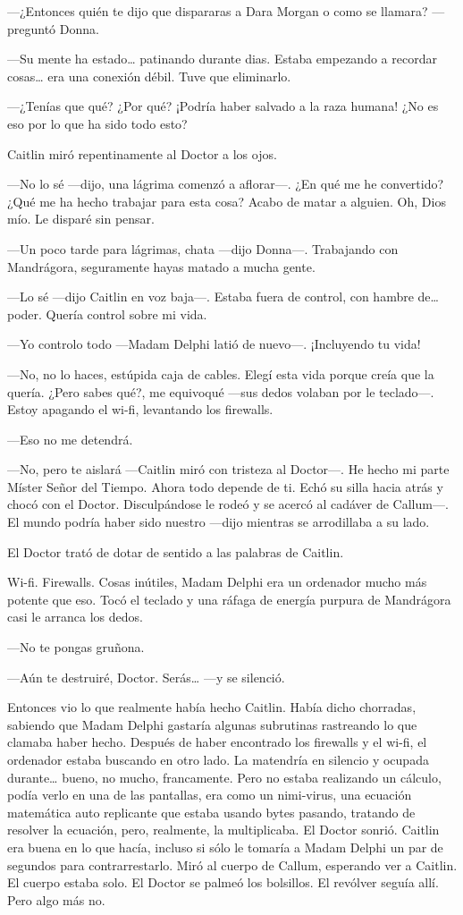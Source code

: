 ---¿Entonces quién te dijo que dispararas a Dara Morgan o como se
llamara? ---preguntó Donna.

---Su mente ha estado\ldots{} patinando durante dias. Estaba empezando a
recordar cosas\ldots{} era una conexión débil. Tuve que eliminarlo.

---¿Tenías que qué? ¿Por qué? ¡Podría haber salvado a la raza humana!
¿No es eso por lo que ha sido todo esto?

Caitlin miró repentinamente al Doctor a los ojos.

---No lo sé ---dijo, una lágrima comenzó a aflorar---. ¿En qué me he
convertido? ¿Qué me ha hecho trabajar para esta cosa? Acabo de matar a
alguien. Oh, Dios mío. Le disparé sin pensar.

---Un poco tarde para lágrimas, chata ---dijo Donna---. Trabajando con
Mandrágora, seguramente hayas matado a mucha gente.

---Lo sé ---dijo Caitlin en voz baja---. Estaba fuera de control, con
hambre de\ldots{} poder. Quería control sobre mi vida.

---Yo controlo todo ---Madam Delphi latió de nuevo---. ¡Incluyendo tu
vida!

---No, no lo haces, estúpida caja de cables. Elegí esta vida porque
creía que la quería. ¿Pero sabes qué?, me equivoqué ---sus dedos volaban
por le teclado---. Estoy apagando el wi-fi, levantando los firewalls.

---Eso no me detendrá.

---No, pero te aislará ---Caitlin miró con tristeza al Doctor---. He
hecho mi parte Míster Señor del Tiempo. Ahora todo depende de ti. Echó
su silla hacia atrás y chocó con el Doctor. Disculpándose le rodeó y se
acercó al cadáver de Callum---. El mundo podría haber sido nuestro
---dijo mientras se arrodillaba a su lado.

El Doctor trató de dotar de sentido a las palabras de Caitlin.

Wi-fi. Firewalls. Cosas inútiles, Madam Delphi era un ordenador mucho
más potente que eso. Tocó el teclado y una ráfaga de energía purpura de
Mandrágora casi le arranca los dedos.

---No te pongas gruñona.

---Aún te destruiré, Doctor. Serás\ldots{} ---y se silenció.

Entonces vio lo que realmente había hecho Caitlin. Había dicho
chorradas, sabiendo que Madam Delphi gastaría algunas subrutinas
rastreando lo que clamaba haber hecho. Después de haber encontrado los
firewalls y el wi-fi, el ordenador estaba buscando en otro lado. La
matendría en silencio y ocupada durante\ldots{} bueno, no mucho,
francamente. Pero no estaba realizando un cálculo, podía verlo en una de
las pantallas, era como un nimi-virus, una ecuación matemática auto
replicante que estaba usando bytes pasando, tratando de resolver la
ecuación, pero, realmente, la multiplicaba. El Doctor sonrió. Caitlin
era buena en lo que hacía, incluso si sólo le tomaría a Madam Delphi un
par de segundos para contrarrestarlo. Miró al cuerpo de Callum,
esperando ver a Caitlin. El cuerpo estaba solo. El Doctor se palmeó los
bolsillos. El revólver seguía allí. Pero algo más no.

